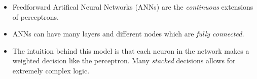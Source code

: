 \documentclass{beamer}
\def\layersep{2cm}
\begin{document}
\begin{frame}
\begin{figure}
        \end{figure}
        \begin{itemize}
        \item Feedforward Artifical Neural Networks (ANNs) are the \emph{continuous}
        extensions of perceptrons.
        \item ANNs can have many layers and different nodes
         which are \emph{fully connected.}

         \item The intuition behind this model is that each neuron in the network
         makes a weighted decision like the perceptron. Many \emph{stacked} decisions
         allows for extremely complex logic.
        \end{itemize}
    \end{frame}
\end{document}
